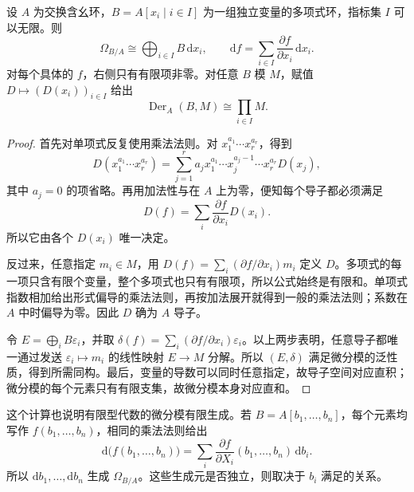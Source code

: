 \begin{proposition}\label{g5:prop:polynomial-differentials}
	设 \(A\) 为交换含幺环，\(B=A[x_i\mid i\in I]\) 为一组独立变量的多项式环，指标集 \(I\) 可以无限。则
	\[
		\Omega_{B/A}\cong\bigoplus_{i\in I}B\,\mathrm{d}x_i,
		\qquad
		\mathrm{d}f=\sum_{i\in I}\frac{\partial f}{\partial x_i}\,\mathrm{d}x_i.
	\]
	对每个具体的 \(f\)，右侧只有有限项非零。对任意 \(B\) 模 \(M\)，赋值 \(D\mapsto(D(x_i))_{i\in I}\) 给出
	\[
		\operatorname{Der}_A(B,M)\cong\prod_{i\in I}M.
	\]
\end{proposition}
\begin{proof}
	首先对单项式反复使用乘法法则。对
	\(x_1^{a_1}\cdots x_r^{a_r}\)，得到
	\[
		D(x_1^{a_1}\cdots x_r^{a_r})
		=\sum_{j=1}^r a_jx_1^{a_1}\cdots x_j^{a_j-1}
		\cdots x_r^{a_r}D(x_j),
	\]
	其中 \(a_j=0\) 的项省略。再用加法性与在 \(A\) 上为零，便知每个导子都必须满足
	\[
		D(f)=\sum_i\frac{\partial f}{\partial x_i}D(x_i).
	\]
	所以它由各个 \(D(x_i)\) 唯一决定。

	反过来，任意指定 \(m_i\in M\)，用
	\(D(f)=\sum_i(\partial f/\partial x_i)m_i\) 定义 \(D\)。多项式的每一项只含有限个变量，整个多项式也只有有限项，所以公式始终是有限和。单项式指数相加给出形式偏导的乘法法则，再按加法展开就得到一般的乘法法则；系数在 \(A\) 中时偏导为零。因此 \(D\) 确为 \(A\) 导子。

	令 \(E=\bigoplus_i B\varepsilon_i\)，并取
	\(\delta(f)=\sum_i(\partial f/\partial x_i)\varepsilon_i\)。以上两步表明，任意导子都唯一通过发送 \(\varepsilon_i\mapsto m_i\) 的线性映射 \(E\to M\) 分解。所以 \((E,\delta)\) 满足微分模的泛性质，得到所需同构。最后，变量的导数可以同时任意指定，故导子空间对应直积；微分模的每个元素只有有限支集，故微分模本身对应直和。
\end{proof}

这个计算也说明有限型代数的微分模有限生成。若 \(B=A[b_1,\ldots,b_n]\)，每个元素均写作 \(f(b_1,\ldots,b_n)\)，相同的乘法法则给出
\[
	\mathrm{d}\bigl(f(b_1,\ldots,b_n)\bigr)
	=\sum_i\frac{\partial f}{\partial X_i}(b_1,\ldots,b_n)\,\mathrm{d}b_i.
\]
所以 \(\mathrm{d}b_1,\ldots,\mathrm{d}b_n\) 生成 \(\Omega_{B/A}\)。这些生成元是否独立，则取决于 \(b_i\) 满足的关系。

